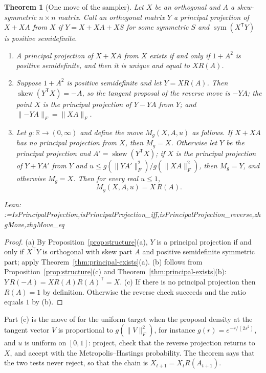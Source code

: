 \documentclass[11pt]{amsart}
\makeatletter
\newtheorem{theorem}{Theorem}[section]
\theoremstyle{definition}
\theoremstyle{remark}
\newcommand{\@leanlist}[1]{\def\@leansep{}\@for\@leanname:=#1\do{\@leansep
  \texttt{\expandafter\detokenize\expandafter{\@leanname}}\def\@leansep{, }}}
\newcommand{\lean}[1]{\par\smallskip\noindent
  {\footnotesize\normalfont\raggedright\textsf{Lean:} \@leanlist{#1}\par}}
\newcommand{\R}{\mathbb{R}}
\newcommand{\sym}{\operatorname{sym}}
\newcommand{\skw}{\operatorname{skew}}
\newcommand{\fro}[1]{\lVert #1\rVert_{F}}
\newcommand{\transp}{^{\mathsf T}}
\makeatother
\begin{document}
\begin{theorem}[One move of the sampler]\label{thm:zhg-move}
Let $X$ be an orthogonal and $A$ a skew-symmetric $n\times n$ matrix.  Call an orthogonal matrix
$Y$ a \emph{principal projection of $X+XA$ from $X$} if $Y=X+XA+XS$ for some symmetric $S$ and
$\sym(X\transp Y)$ is positive semidefinite.
\begin{enumerate}
\item[(a)] A principal projection of $X+XA$ from $X$ exists if and only if $1+A^2$ is positive
semidefinite, and then it is unique and equal to $XR(A)$.
\item[(b)] Suppose $1+A^2$ is positive semidefinite and let $Y=XR(A)$.  Then
$\skw(Y\transp X)=-A$, so the tangent proposal of the reverse move is $-YA$; the point $X$ is
the principal projection of $Y-YA$ from $Y$; and $\fro{-YA}=\fro{XA}$.
\item[(c)] Let $g\colon\R\to(0,\infty)$ and define the move $M_g(X,A,u)$ as follows.  If
$X+XA$ has no principal projection from $X$, then $M_g=X$.  Otherwise let $Y$ be the principal
projection and $A'=\skw(Y\transp X)$; if $X$ is the principal projection of $Y+YA'$ from $Y$ and
$u\le g(\fro{YA'}^2)/g(\fro{XA}^2)$, then $M_g=Y$, and otherwise $M_g=X$.  Then for every real
$u\le1$,
\[
  M_g(X,A,u)=X\,R(A).
\]
\end{enumerate}
\lean{IsPrincipalProjection,isPrincipalProjection_iff,isPrincipalProjection_reverse,zhgMove,zhgMove_eq}
\end{theorem}

\begin{proof}
(a) By Proposition~\ref{prop:structure}(a), $Y$ is a principal projection if and only if
$X\transp Y$ is orthogonal with skew part $A$ and positive semidefinite symmetric part; apply
Theorem~\ref{thm:principal-exists}(a).  (b) follows from Proposition~\ref{prop:structure}(c) and
Theorem~\ref{thm:principal-exists}(b): $Y\,R(-A)=XR(A)R(A)\transp=X$.  (c) If there is no
principal projection then $R(A)=1$ by definition.  Otherwise the reverse check succeeds and the
ratio equals $1$ by (b).
\end{proof}

Part (c) is the move of \cite{ZHG} for the uniform target when the proposal density at the
tangent vector $V$ is proportional to $g(\fro{V}^2)$, for instance
$g(r)=e^{-r/(2s^2)}$, and $u$ is uniform on $[0,1]$: project, check that the reverse projection
returns to $X$, and accept with the Metropolis--Hastings probability.  The theorem says that the
two tests never reject, so that the chain is $X_{t+1}=X_tR(A_{t+1})$.
\end{document}

